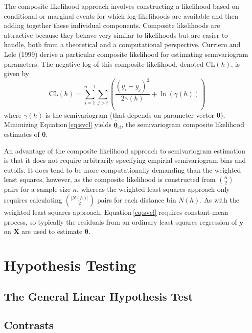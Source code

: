 \documentclass{article}
\begin{document}
The composite likelihood approach involves constructing a likelihood
based on conditional or marginal events for which log-likelihoods are
available and then adding together these individual components.
Composite likelihoods are attractive because they behave very similar to
likelihoods but are easier to handle, both from a theoretical and a
computational perspective. Curriero and Lele (1999) derive a particular
composite likelihood for estimating semivariogram parameters. The
negative log of this composite likelihood, denoted \(\text{CL}(h)\), is
given by \begin{equation}\label{eq:svcl}
  \text{CL}(h) = \sum_{i = 1}^{n - 1} \sum_{j > i} \left( \frac{(y_i - y_j)^2}{2\gamma(h)} + \ln(\gamma(h)) \right)
\end{equation} where \(\gamma(h)\) is the semivariogram (that depends on
parameter vector \(\bm{\theta}\)). Minimizing Equation\(~\)\ref{eq:svcl}
yields \(\bm{\hat{\theta}}_{cl}\), the semivariogram composite
likelihood estimates of \(\bm{\theta}\).

An advantage of the composite likelihood approach to semivariogram
estimation is that it does not require arbitrarily specifying empirial
semivariogram bins and cutoffs. It does tend to be more computationally
demanding than the weighted least squares, however, as the composite
likelihood is constructed from \(\binom{n}{2}\) pairs for a sample size
\(n\), whereas the weighted least squares approach only requires
calculating \(\binom{|N(h)|}{2}\) pairs for each distance bin \(N(h)\).
As with the weighted least squares approach, Equation\(~\)\ref{eq:svcl}
requires constant-mean process, so typically the residuals from an
ordinary least squares regression of \(\mathbf{y}\) on \(\mathbf{X}\)
are used to estimate \(\bm{\theta}\).

\hypertarget{hypothesis-testing}{%
\section{Hypothesis Testing}\label{hypothesis-testing}}

\hypertarget{the-general-linear-hypothesis-test}{%
\subsection{The General Linear Hypothesis
Test}\label{the-general-linear-hypothesis-test}}

\hypertarget{contrasts}{%
\subsection{Contrasts}\label{contrasts}}
\end{document}
